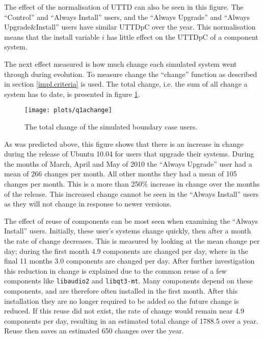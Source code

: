The effect of the normalisation of UTTD can also be seen in this figure.
The ``Control'' and ``Always Install'' users, and the ``Always Upgrade'' and ``Always Upgrade\&Install'' users have similar UTTDpC over the year.
This normalisation means that the install variable $i$ has little effect on the UTTDpC of a component system.


The next effect measured is how much change each simulated system went through during evolution.
To measure change the ``change'' function as described in section \ref{impl.criteria} is used.
The total change, i.e. the sum of all change a system has to date, is presented in figure \ref{exp.q1achange}.
\begin{figure}[htp]
\begin{center}
  \texttt{[image: plots/q1achange]}
  \caption{The total change of the simulated boundary case users.}
  \label{exp.q1achange}
\end{center}
\end{figure}

As was predicted above, this figure shows that there is an increase in change during the release of Ubuntu 10.04 for users that upgrade their systems.
During the months of March, April and May of 2010 the ``Always Upgrade'' user had a mean of 266 changes per month.
All other months they had a mean of 105 changes per month.
This is a more than 250\% increase in change over the months of the release.
This increased change cannot be seen in the ``Always Install'' users as they will not change in response to newer versions.

The effect of reuse of components can be most seen when examining the ``Always Install'' users.
Initially, these user's systems change quickly, then after a month the rate of change decreases.
This is measured by looking at the mean change per day; during the first month 4.9 components are changed per day, where in the final 11 months 3.0 components are changed per day.
After further investigation this reduction in change is explained due to the common reuse of a few components like \texttt{libaudio2} and \texttt{libqt3-mt}.
Many components depend on these components, and are therefore often installed in the first month.
After this installation they are no longer required to be added so the future change is reduced.
If this reuse did not exist, the rate of change would remain near 4.9 components per day, resulting in an estimated total change of 1788.5 over a year.
Reuse then saves an estimated 650 changes over the year.

